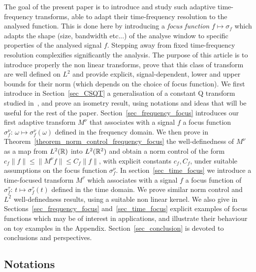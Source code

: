 \smallskip
The goal of the present paper is to introduce and study such adaptive time-frequency transforms, able to adapt their time-frequency resolution to the analysed function.
This is done here by introducing a \textit{focus function} $f\mapsto\sigma_f$ which adapts the shape (size, bandwidth etc...) of the analyse window to specific properties of the analysed signal $f$. %
Stepping away from fixed time-frequency resolution complexifies significantly the analysis.
The purpose of this article is to introduce properly the non linear transforms, prove that this class of transform are well defined on $L^2$ and provide explicit, signal-dependent, lower and upper bounds for their norm (which depends on the choice of focus function).
We first introduce in Section~\ref{sec_CSQT} a generalisation of a constant Q transform studied in~\cite{velasco2011constructing,holighaus2012framework}, and prove an isometry result, using notations and ideas that will be useful for the rest of the paper. Section~\ref{sec_frequency_focus} introduces our first adaptive transform $M^\nu$ that associates with a signal $f$ a focus function $\sigma_f^\nu: \,\omega\mapsto\sigma^\nu_f(\omega)$ defined in the frequency domain. We then prove in Theorem~\ref{theorem_norm_control_frequency_focus} the well-definedness of $M^\nu$ as a map from $L^2(\mathbb{R})$ into $L^2(\mathbb{R}^2)$ and obtain a norm control of the form $c_f\|f\|\le \|M^\nu f\|\le C_f\|f\|$, with explicit constants $c_f,C_f$, under suitable assumptions on the focus function $\sigma_f^\nu$. In section~\ref{sec_time_focus} we introduce a time-focused transform $M^\tau$ which associates with a signal $f$ a focus function of $\sigma_f^\tau:\,t\mapsto \sigma^\tau_f(t)$ defined in the time domain. We prove similar norm control and $L^2$ well-definedness results, 
using a suitable non linear kernel. We also give in Sections~\ref{sec_frequency_focus} and~\ref{sec_time_focus} explicit examples of focus functions which may be of interest in applications, and illustrate their behaviour on toy examples in the Appendix. Section~\ref{sec_conclusion} is devoted to conclusions and perspectives.





\subsection{Notations}

